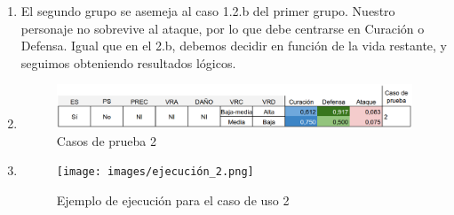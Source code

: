 \begin{enumerate}
\item El segundo grupo se asemeja al caso 1.2.b del primer grupo. Nuestro personaje no sobrevive al ataque, por lo que debe centrarse en Curación o Defensa. Igual que en el 2.b, debemos decidir en función de la vida restante, y seguimos obteniendo resultados lógicos.

\item[]
\begin{figure}[H]
	\centering
	\includegraphics[width=\textwidth,height=\textheight,keepaspectratio]{images/casos_pruebas1.png}
	\caption{Casos de prueba 2}
	\label{fig:casos_prueba2}
\end{figure}

\item[] \begin{figure}[H]
	\centering
	\texttt{[image: images/ejecución\_2.png]}
	\caption{Ejemplo de ejecución para el caso de uso 2}
	\label{fig:casos_prueba1}
\end{figure}


\end{enumerate}

